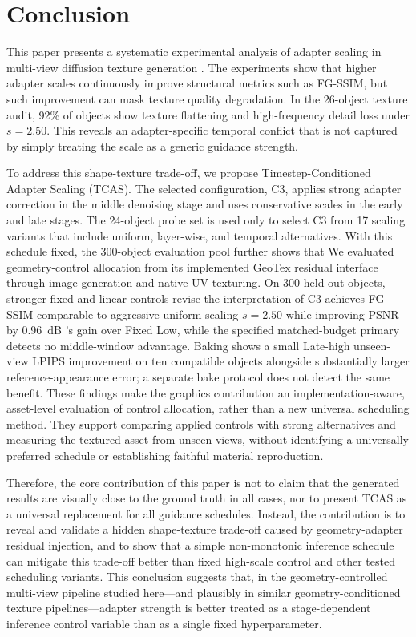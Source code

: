 \documentclass[times,twocolumn,final]{elsarticle}
\providecommand{\DIFadd}[1]{{\protect\color{blue} \sf #1}} %
\providecommand{\DIFdel}[1]{{\protect\color{red} \scriptsize #1}} %
\providecommand{\DIFaddbegin}{} %
\providecommand{\DIFaddend}{} %
\providecommand{\DIFdelbegin}{} %
\providecommand{\DIFdelend}{} %
\begin{document}
\section{Conclusion}
\label{sec:conclusion}

\DIFdelbegin \DIFdel{This paper presents a systematic experimental analysis of adapter scaling in multi-view diffusion texture generation . The experiments show that higher adapter scales continuously improve structural metrics such as FG-SSIM, but such improvement can mask texture quality degradation. In the 26-object texture audit, 92\% of objects show texture flattening and high-frequency detail loss under $s = 2.50$. This reveals an adapter-specific temporal conflict that is not captured by simply treating the scale as a generic guidance strength.
}%

\DIFdel{To address this shape-texture trade-off, we propose Timestep-Conditioned Adapter Scaling (TCAS). The selected configuration, C3, applies strong adapter correction in the middle denoising stage and uses conservative scales in the early and late stages. The 24-object probe set is used only to select C3 from 17 scaling variants that include uniform, layer-wise, and temporal alternatives. With this schedule fixed, the 300-object evaluation pool further shows that }\DIFdelend \DIFaddbegin \DIFadd{We evaluated geometry-control allocation from its implemented GeoTex residual interface through image generation and native-UV texturing. On 300 held-out objects, stronger fixed and linear controls revise the interpretation of }\DIFaddend C3\DIFdelbegin \DIFdel{achieves FG-SSIM comparable to aggressive uniform scaling $s = 2.50$ while improving PSNR by 0.96~dB}\DIFdelend \DIFaddbegin \DIFadd{'s gain over Fixed Low, while the specified matched-budget primary detects no middle-window advantage. Baking shows a small Late-high unseen-view LPIPS improvement on ten compatible objects alongside substantially larger reference-appearance error; a separate bake protocol does not detect the same benefit. These findings make the graphics contribution an implementation-aware, asset-level evaluation of control allocation, rather than a new universal scheduling method. They support comparing applied controls with strong alternatives and measuring the textured asset from unseen views, without identifying a universally preferred schedule or establishing faithful material reproduction}\DIFaddend .

\DIFdelbegin \DIFdel{Therefore, the core contribution of this paper is not to claim that the generated results are visually close to the ground truth in all cases, nor to present TCAS as a universal replacement for all guidance schedules. Instead, the contribution is to reveal and validate a hidden shape-texture trade-off caused by geometry-adapter residual injection, and to show that a simple non-monotonic inference schedule can mitigate this trade-off better than fixed high-scale control and other tested scheduling variants. This conclusion suggests that, in the geometry-controlled multi-view pipeline studied here---and plausibly in similar geometry-conditioned texture pipelines---adapter strength is better treated as a stage-dependent inference control variable than as a single fixed hyperparameter. }%
\end{document}
